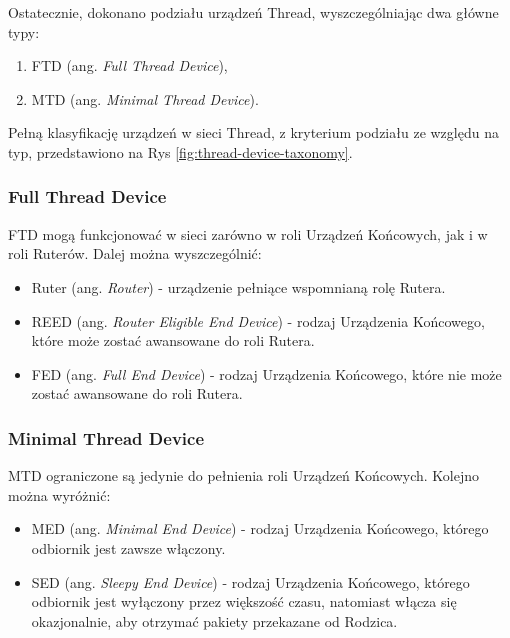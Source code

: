         Ostatecznie, dokonano podziału urządzeń Thread, wyszczególniając dwa główne typy:
        \begin{enumerate}
            \item FTD (ang. \textit{Full Thread Device}),
            \item MTD (ang. \textit{Minimal Thread Device}).
        \end{enumerate}

        Pełną klasyfikację urządzeń w sieci Thread, z kryterium podziału ze względu na typ, przedstawiono na Rys \ref{fig:thread-device-taxonomy}.

        \subsubsection{Full Thread Device}

            FTD mogą funkcjonować w sieci zarówno w roli Urządzeń Końcowych, jak i w roli Ruterów. Dalej można wyszczególnić: 
            \begin{itemize}
                \item Ruter (ang. \textit{Router}) - urządzenie pełniące wspomnianą rolę Rutera.
                \item REED (ang. \textit{Router Eligible End Device}) - rodzaj Urządzenia Końcowego, które może zostać awansowane do roli Rutera.
                \item FED (ang. \textit{Full End Device}) - rodzaj Urządzenia Końcowego, które nie może zostać awansowane do roli Rutera.
            \end{itemize}
        
        \subsubsection{Minimal Thread Device}

            MTD ograniczone są jedynie do pełnienia roli Urządzeń Końcowych. Kolejno można wyróżnić:
            \begin{itemize}
                \item MED (ang. \textit{Minimal End Device}) - rodzaj Urządzenia Końcowego, którego odbiornik jest zawsze włączony.
                \item SED (ang. \textit{Sleepy End Device}) - rodzaj Urządzenia Końcowego, którego odbiornik jest wyłączony przez większość czasu, natomiast włącza się okazjonalnie, aby otrzymać pakiety przekazane od Rodzica.
            \end{itemize}

